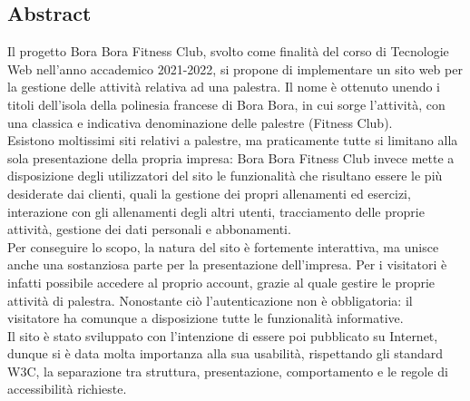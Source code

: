 \documentclass[a4paper]{article}
\begin{document}
	\subsection{Abstract}
	Il progetto Bora Bora Fitness Club, svolto come finalità del corso di Tecnologie Web nell'anno accademico 2021-2022, si propone di implementare un sito web per la gestione delle attività relativa ad una palestra. Il nome è ottenuto unendo i titoli dell'isola della polinesia francese di Bora Bora, in cui sorge l'attività, con una classica e indicativa denominazione delle palestre (Fitness Club).\\ 
	Esistono moltissimi siti relativi a palestre, ma praticamente tutte si limitano alla sola presentazione della propria impresa: Bora Bora Fitness Club invece mette a disposizione degli utilizzatori del sito le funzionalità che risultano essere le più desiderate dai clienti, quali la gestione dei propri allenamenti ed esercizi, interazione con gli allenamenti degli altri utenti, tracciamento delle proprie attività, gestione dei dati personali e abbonamenti.\\
	Per conseguire lo scopo, la natura del sito è fortemente interattiva, ma unisce anche una sostanziosa parte per la presentazione dell'impresa. Per i visitatori è infatti possibile accedere al proprio account, grazie al quale gestire le proprie attività di palestra. Nonostante ciò l'autenticazione non è obbligatoria: il visitatore ha comunque a disposizione tutte le funzionalità informative.\\
	Il sito è stato sviluppato con l'intenzione di essere poi pubblicato su Internet, dunque si è data molta importanza alla sua usabilità, rispettando gli standard W3C, la separazione tra struttura, presentazione, comportamento e le regole di accessibilità richieste.
\end{document}
